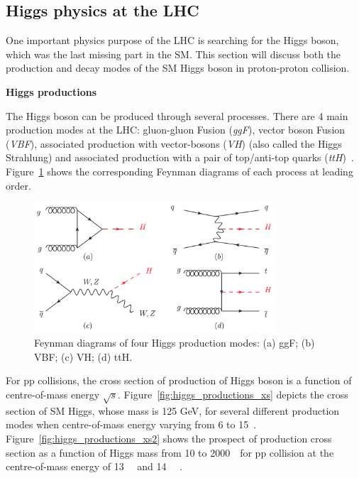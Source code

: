 \subsection{Higgs physics at the LHC}
\label{higgs}

One important physics purpose of the LHC is searching for the Higgs boson, which was the last missing part in the SM.
This section will discuss both the production and decay modes of the SM Higgs boson in proton-proton collision.

\textbf{Higgs productions}

The Higgs boson can be produced through several processes.
There are 4 main production modes at the LHC: gluon-gluon Fusion (\textit{ggF}), vector boson Fusion (\textit{VBF}),
associated production with vector-bosons (\textit{VH}) (also called the Higgs Strahlung) 
and associated production with a pair of top/anti-top quarks (\textit{ttH})~\cite{Grojean:2243593}.
Figure~\ref{fig:higgs_productions_fd} shows the corresponding Feynman diagrams of each process at leading order.
\begin{figure}[!htb]
  \centering
  \includegraphics[width=0.8\textwidth]{figures/Theory/Figures_FeynmanHprod.png}
  \caption{Feynman diagrams of four Higgs production modes:
	   (a) ggF; (b) VBF; (c) VH; (d) ttH.}
  \label{fig:higgs_productions_fd}
\end{figure}
For pp collisions, the cross section of production of Higgs boson is a function of centre-of-mass energy $\sqrt{s}$. 
Figure~\ref{fig:higgs_productions_xs} depicts the cross section of SM Higgs, whose mass is 125 GeV, for several different production modes when centre-of-mass energy varying from 6 to 15~\tev.
Figure~\ref{fig:higgs_productions_xs2} shows the prospect of production cross section  
as a function of Higgs mass from 10 to 2000~\gev~for pp collision at the centre-of-mass energy of 13~\tev~ and 14~\tev~ \cite{deFlorian:2227475}. 
